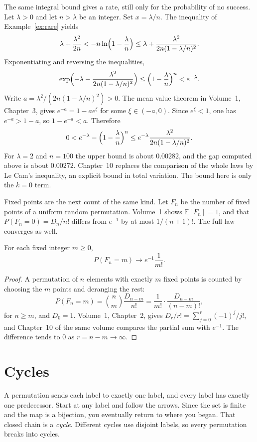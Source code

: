 \begin{examplex}
The same integral bound gives a rate, still only for the probability of no success. Let $\lambda>0$ and let $n>\lambda$ be an integer. Set $x=\lambda/n$. The inequality of Example~\ref{ex:rare} yields
\[
 \lambda+\frac{\lambda^2}{2n}
 <-n\ln\Bigl(1-\frac\lambda n\Bigr)
 \le\lambda+\frac{\lambda^2}{2n(1-\lambda/n)^2}.
\]
Exponentiating and reversing the inequalities,
\[
 \exp\Bigl(-\lambda-\frac{\lambda^2}{2n(1-\lambda/n)^2}\Bigr)
 \le\Bigl(1-\frac\lambda n\Bigr)^n
 <e^{-\lambda}.
\]
Write $a=\lambda^2/(2n(1-\lambda/n)^2)>0$. The mean value theorem in Volume~1, Chapter~3, gives $e^{-a}=1-ae^{\xi}$ for some $\xi\in(-a,0)$. Since $e^{\xi}<1$, one has $e^{-a}>1-a$, so $1-e^{-a}<a$. Therefore
\[
 0<e^{-\lambda}-\Bigl(1-\frac\lambda n\Bigr)^n
 \le e^{-\lambda}\frac{\lambda^2}{2n(1-\lambda/n)^2}.
\]
For $\lambda=2$ and $n=100$ the upper bound is about $0.00282$, and the gap computed above is about $0.00272$. Chapter~10 replaces the comparison of the whole laws by Le Cam's inequality, an explicit bound in total variation. The bound here is only the $k=0$ term.
\end{examplex}

Fixed points are the next count of the same kind. Let $F_n$ be the number of fixed points of a uniform random permutation. Volume~1 shows $\mathbb E[F_n]=1$, and that $P(F_n=0)=D_n/n!$ differs from $e^{-1}$ by at most $1/(n+1)!$. The full law converges as well.

\begin{proposition}\label{prop:fixedpoisson}
For each fixed integer $m\ge0$,
\[
 P(F_n=m)\to e^{-1}\frac1{m!}.
\]
\end{proposition}
\begin{proof}
A permutation of $n$ elements with exactly $m$ fixed points is counted by choosing the $m$ points and deranging the rest:
\[
 P(F_n=m)=\binom{n}{m}\frac{D_{n-m}}{n!}=\frac1{m!}\cdot\frac{D_{n-m}}{(n-m)!},
\]
for $n\ge m$, and $D_0=1$. Volume~1, Chapter~2, gives $D_r/r!=\sum_{j=0}^r(-1)^j/j!$, and Chapter~10 of the same volume compares the partial sum with $e^{-1}$. The difference tends to $0$ as $r=n-m\to\infty$.
\end{proof}

\section{Cycles}

A permutation sends each label to exactly one label, and every label has exactly one predecessor. Start at any label and follow the arrows. Since the set is finite and the map is a bijection, you eventually return to where you began. That closed chain is a \emph{cycle}. Different cycles use disjoint labels, so every permutation breaks into cycles.

